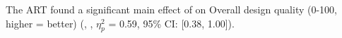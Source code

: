 The ART found a significant main effect of \Phase on Overall design quality (0-100, higher = better) (, , $\eta_{p}^{2}$ = 0.59, 95\% CI: [0.38, 1.00]). 
